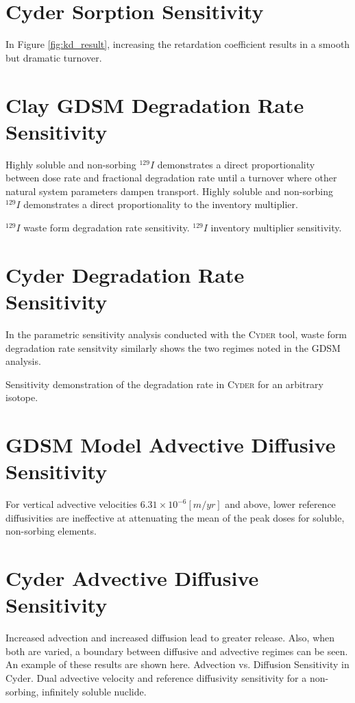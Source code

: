 \documentclass[letterpaper]{article}
\newcommand{\Cyder}{\textsc{Cyder}\xspace}
\begin{document}
{\section{Cyder Sorption Sensitivity}

In Figure \ref{fig:kd_result}, increasing the retardation 
coefficient results in a smooth but dramatic turnover. 


\section{Clay GDSM Degradation Rate Sensitivity}

Highly soluble and non-sorbing $^{129}I$ demonstrates a direct proportionality between dose rate and 
fractional degradation rate until a turnover where other natural system 
parameters dampen transport. Highly soluble and non-sorbing $^{129}I$ demonstrates a direct 
proportionality to the inventory multiplier.

$^{129}I$ waste form degradation rate sensitivity.
$^{129}I$ inventory multiplier sensitivity.


\section{Cyder Degradation Rate Sensitivity}
In the parametric sensitivity analysis conducted with the \Cyder tool, waste 
form degradation rate sensitvity similarly shows the two regimes noted in the 
GDSM analysis.  

Sensitivity demonstration of the degradation rate in \Cyder for an 
arbitrary isotope.


\section{GDSM Model Advective Diffusive Sensitivity}
For vertical advective velocities 
$6.31\times10^{-6}[m/yr]$ and above, lower reference diffusivities are 
ineffective at attenuating the mean of the peak doses for soluble, non-sorbing 
elements. 

\section{Cyder Advective Diffusive Sensitivity}
Increased advection and increased diffusion lead to greater release. Also, when 
both are varied, a boundary between diffusive and advective
regimes can be seen. An example of these results are shown here.
Advection vs. Diffusion Sensitivity in Cyder. Dual advective velocity 
and reference diffusivity sensitivity for a non-sorbing, infinitely soluble 
nuclide.

}
\end{document}
